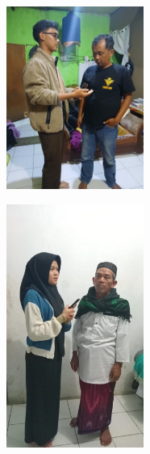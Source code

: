 \documentclass[a4paper,12pt, left=3cm,right=2cm,bottom=2cm, bahasa]{article}
\begin{document}
\begin{figure}[H]

  \begin{center}
    \includegraphics[width=0.4\textwidth]{images/gambar4.jpeg}
  \end{center}
\end{figure}
\begin{figure}[H]

  \begin{center}
    \includegraphics[width=0.4\textwidth]{images/gambar5.jpeg}
  \end{center}
\end{figure}
\end{document}
